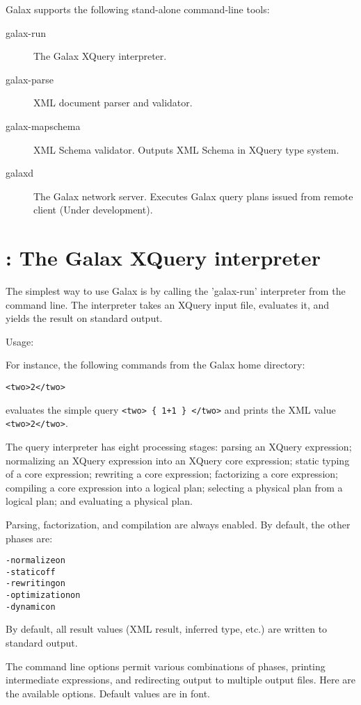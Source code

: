 Galax supports the following stand-alone command-line tools:

\begin{description}
\item[galax-run] The Galax XQuery interpreter.               
\item[galax-parse] XML document parser and validator. 
\item[galax-mapschema] XML Schema validator.  Outputs XML Schema in XQuery type system.
\item[galaxd] The Galax network server.  Executes Galax query plans
  issued from remote client (Under development).
\end{description}

\section{ : The Galax XQuery interpreter}
The simplest way to use Galax is by calling the 'galax-run' interpreter
from the command line. The interpreter takes an XQuery input file, 
evaluates it, and yields the result on standard output. 

Usage: 

For instance, the following commands from the Galax home directory:
\begin{alltt}
%  echo "<two> { 1+1 } </two>" > test.xq
%  $(GALAXHOME)/bin/galax-run test.xq
<two>2</two>
\end{alltt}
evaluates the simple query \verb|<two> { 1+1 } </two>| and prints the
XML value \verb|<two>2</two>|.

The query interpreter has eight processing stages:
   parsing an XQuery expression;
   normalizing an XQuery expression into an XQuery core expression;
   static typing of a core expression;
   rewriting a core expression;
   factorizing a core expression;
   compiling a core expression into a logical plan;
   selecting a physical plan from a logical plan;
   and evaluating a physical plan.

Parsing, factorization, and compilation are always enabled. By default, the other phases are:
\begin{alltt}
   -normalize on 
   -static off   
   -rewriting on 
   -optimization on
   -dynamic on 
\end{alltt}
By default, all result values (XML result, inferred type, etc.) are written
to standard output.

The command line options permit various combinations of phases,
printing intermediate expressions, and redirecting output to multiple
output files.  Here are the available options.  Default values are in
 font.

